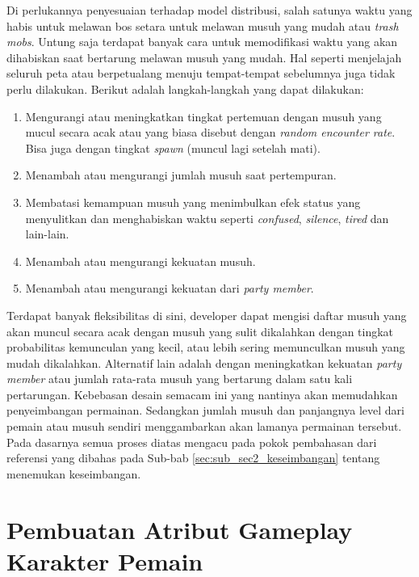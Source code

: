 \begin{enumerate}[label=\textbf{\arabic*).}]
	Di perlukannya penyesuaian terhadap model distribusi, salah satunya waktu yang habis untuk melawan bos setara untuk melawan musuh yang mudah atau \textit{trash mobs}. Untung saja terdapat banyak cara untuk memodifikasi waktu yang akan dihabiskan saat bertarung melawan musuh yang mudah. Hal seperti menjelajah seluruh peta atau berpetualang menuju tempat-tempat sebelumnya juga tidak perlu dilakukan. Berikut adalah langkah-langkah yang dapat dilakukan:

	\begin{enumerate} [label=\alph*).]
		\item  Mengurangi atau meningkatkan tingkat pertemuan dengan musuh yang mucul secara acak atau yang biasa disebut dengan \textit{random encounter rate}. Bisa juga dengan tingkat \textit{spawn} (muncul lagi setelah mati).
		\item Menambah atau mengurangi jumlah musuh saat pertempuran.
		\item Membatasi kemampuan musuh yang menimbulkan efek status yang menyulitkan dan menghabiskan waktu seperti \textit{confused}, \textit{silence}, \textit{tired} dan lain-lain.
		\item Menambah atau mengurangi kekuatan musuh.
		\item Menambah atau mengurangi kekuatan dari \textit{party member}.
	\end{enumerate}
\end{enumerate}

Terdapat banyak fleksibilitas di sini, developer dapat mengisi daftar musuh yang akan muncul secara acak dengan musuh yang sulit dikalahkan dengan tingkat probabilitas kemunculan yang kecil, atau lebih sering memunculkan musuh yang mudah dikalahkan. Alternatif lain adalah dengan meningkatkan kekuatan \textit{party member} atau jumlah rata-rata musuh yang bertarung dalam satu kali pertarungan. Kebebasan desain semacam ini yang nantinya akan memudahkan penyeimbangan permainan. Sedangkan jumlah musuh dan panjangnya level dari pemain atau musuh sendiri menggambarkan akan lamanya permainan tersebut. Pada dasarnya semua proses diatas mengacu pada pokok pembahasan dari referensi yang dibahas pada Sub-bab \ref{sec:sub_sec2_keseimbangan} tentang menemukan keseimbangan.
\vspace{1ex}

\section{Pembuatan Atribut Gameplay Karakter Pemain}
\label{sec:sec3_player_stats}
\vspace{1ex}

